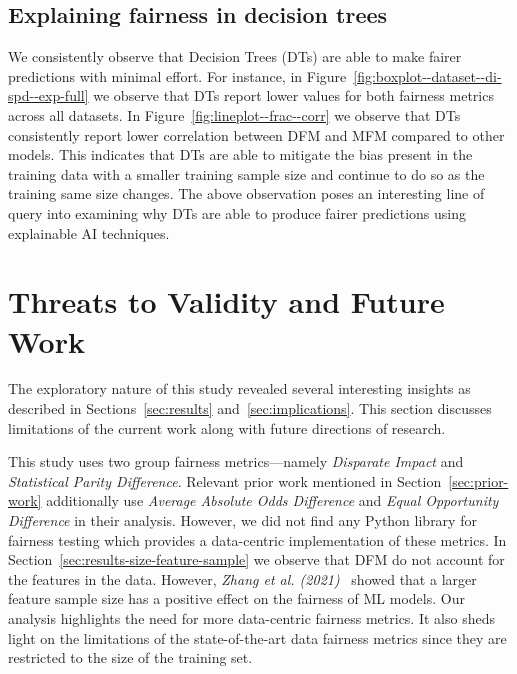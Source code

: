 \documentclass[conference]{IEEEtran}
\begin{document}
\subsection{Explaining fairness in decision trees}\label{sec:discuss-explain-fair-dt}


We consistently observe that Decision Trees (DTs) are able to make
fairer predictions with minimal effort. For instance, in
Figure \ref{fig:boxplot--dataset--di-spd--exp-full} we observe that
DTs report lower values for both fairness metrics across all
datasets. In Figure \ref{fig:lineplot--frac--corr} we observe that DTs
consistently report lower correlation between DFM and MFM compared to
other models. This indicates that DTs are able to mitigate the bias
present in the training data with a smaller training sample size and
continue to do so as the training same size changes. The above
observation poses an interesting line of query into examining why DTs
are able to produce fairer predictions using explainable AI
techniques.

\section{Threats to Validity and Future Work}\label{sec:threats}
The exploratory nature of this study revealed several interesting
insights as described in Sections~\ref{sec:results}
and~\ref{sec:implications}. This section discusses limitations of the
current work along with future directions of research.



This study uses two group fairness metrics---namely \emph{Disparate Impact} and \emph{Statistical Parity Difference}. Relevant prior work mentioned in Section \ref{sec:prior-work} additionally use \emph{Average Absolute Odds Difference} and \emph{Equal Opportunity Difference} in their analysis. However, we did not find any Python library for fairness testing which provides a data-centric implementation of these metrics. In Section \ref{sec:results-size-feature-sample} we observe that DFM do not account for the features in the data. However, \emph{Zhang et al. (2021)}~\cite{zhang2021ignorance} showed that a larger feature sample size has a positive effect on the fairness of ML models. Our analysis highlights the need for more data-centric fairness metrics. It also sheds light on the limitations of the state-of-the-art data fairness metrics since they are restricted to the size of the training set.
\end{document}
